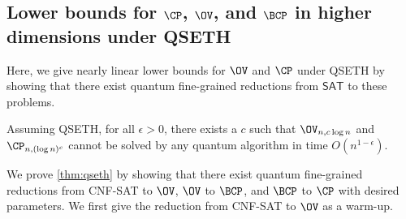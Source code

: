 \subsection{Lower bounds for $\CP$, $\OV$, and $\BCP$ in higher dimensions under QSETH}

Here, we give nearly linear lower bounds for $\OV$ and $\CP$ under QSETH by showing that there exist quantum fine-grained reductions from $\textsf{SAT}$ to these problems. 
\begin{theorem}\label{thm:qseth}
Assuming QSETH, for all $\epsilon>0$, there exists a $c$ such that $\OV_{n,c\log n}$ and $\CP_{n,(\log n)^c}$ cannot be solved by any quantum algorithm in time $O(n^{1-\epsilon})$.
\end{theorem}

We prove \cref{thm:qseth} by showing that there exist quantum fine-grained reductions from \textsf{CNF-SAT} to $\OV$, $\OV$ to $\BCP$, and $\BCP$ to $\CP$ with desired parameters.  We first give the reduction from \textsf{CNF-SAT} to $\OV$ as a warm-up. 

